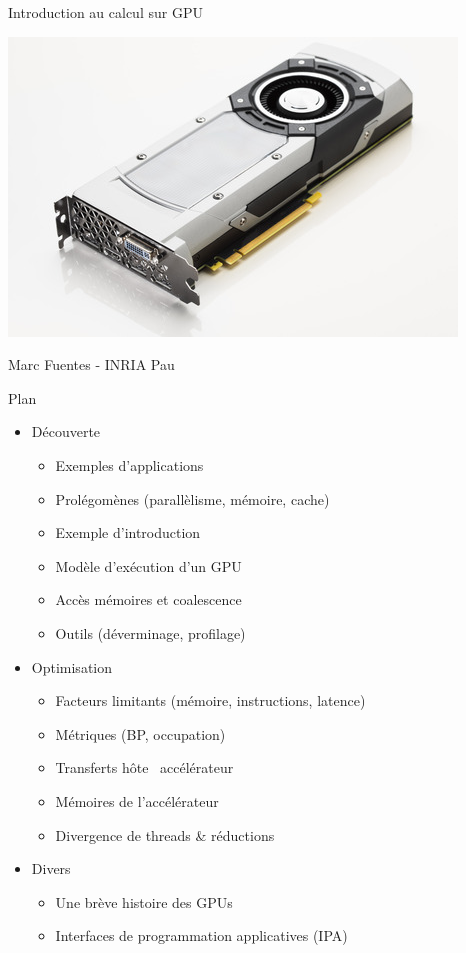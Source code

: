 \documentclass[11pt,mathserif]{beamer}
\newcommand{\geziBikoitz}{\faArrowsH}
\begin{document}
\begin{frame}
\begin{center}
  {\Large Introduction au calcul sur GPU }
\end{center}
\begin{center}
\includegraphics[width=0.5\linewidth]{fig/gpu.jpg}
\end{center}
 \begin{center}
{\large Marc Fuentes - INRIA Pau\\ }
\end{center}
\end{frame}

\begin{frame}{Plan}
\begin{itemize}[<+->]
   \item Découverte
     \begin{itemize}
       \item Exemples d'applications 
       \item Prolégomènes (parallèlisme, mémoire, cache)
       \item Exemple d'introduction
       \item Modèle d'exécution d'un GPU
       \item Accès mémoires et coalescence
       \item Outils (déverminage, profilage)
     \end{itemize}
 \item Optimisation 
     \begin{itemize}
       \item Facteurs limitants (mémoire, instructions, latence)
       \item Métriques (BP, occupation)
       \item Transferts hôte \geziBikoitz\ accélérateur
       \item Mémoires de l'accélérateur
       \item Divergence de threads \& réductions
     \end{itemize}
  \item Divers
     \begin{itemize}
       \item Une brève histoire des GPUs
       \item Interfaces de programmation applicatives (IPA)
     \end{itemize}
\end{itemize}
\end{frame}
\end{document}
